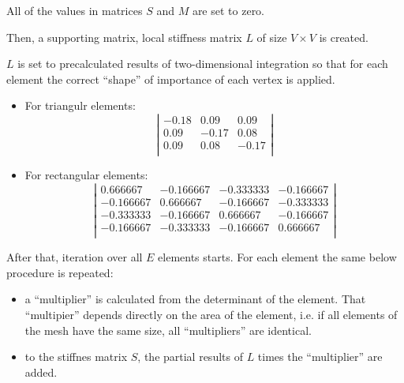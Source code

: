 \documentclass[a4paper,12pt]{article}
\begin{document}
All of the values in matrices $S$ and $M$ are set to zero.

Then, a supporting matrix, local stiffness matrix $L$ of size $V \times V$ is created.

$L$ is set to precalculated results of two-dimensional integration so that for each element the correct ``shape'' of
importance of each vertex is applied.

\begin{itemize}

  \item For triangulr elements:
  \[
  \left| \begin{array}{rrr}
  -0.18 &  0.09 &  0.09 \\
   0.09 & -0.17 &  0.08 \\
   0.09 &  0.08 & -0.17 \\
  \end{array} \right|
  \]

  \item For rectangular elements:
  \[
  \left| \begin{array}{rrrr}
   0.666667 & -0.166667 & -0.333333 & -0.166667 \\
  -0.166667 &  0.666667 & -0.166667 & -0.333333 \\
  -0.333333 & -0.166667 &  0.666667 & -0.166667 \\
  -0.166667 & -0.333333 & -0.166667 &  0.666667 \\
  \end{array} \right|
  \]

\end{itemize}

After that, iteration over all $E$ elements starts. For each element the same below procedure is repeated:

\begin{itemize}

  \item a ``multiplier'' is calculated from the determinant of the element. That ``multipier'' depends directly on the
  area of the element, i.e. if all elements of the mesh have the same size, all ``multipliers'' are identical.

  \item to the stiffnes matrix $S$, the partial results of $L$ times the ``multiplier'' are added.

\end{itemize}
\end{document}
